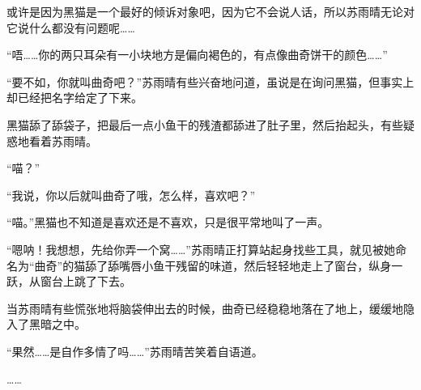 或许是因为黑猫是一个最好的倾诉对象吧，因为它不会说人话，所以苏雨晴无论对它说什么都没有问题呢……

“唔……你的两只耳朵有一小块地方是偏向褐色的，有点像曲奇饼干的颜色……”

“要不如，你就叫曲奇吧？”苏雨晴有些兴奋地问道，虽说是在询问黑猫，但事实上却已经把名字给定了下来。

黑猫舔了舔袋子，把最后一点小鱼干的残渣都舔进了肚子里，然后抬起头，有些疑惑地看着苏雨晴。

“喵？”

“我说，你以后就叫曲奇了哦，怎么样，喜欢吧？”

“喵。”黑猫也不知道是喜欢还是不喜欢，只是很平常地叫了一声。

“嗯呐！我想想，先给你弄一个窝……”苏雨晴正打算站起身找些工具，就见被她命名为“曲奇”的猫舔了舔嘴唇小鱼干残留的味道，然后轻轻地走上了窗台，纵身一跃，从窗台上跳了下去。

当苏雨晴有些慌张地将脑袋伸出去的时候，曲奇已经稳稳地落在了地上，缓缓地隐入了黑暗之中。

“果然……是自作多情了吗……”苏雨晴苦笑着自语道。

……
